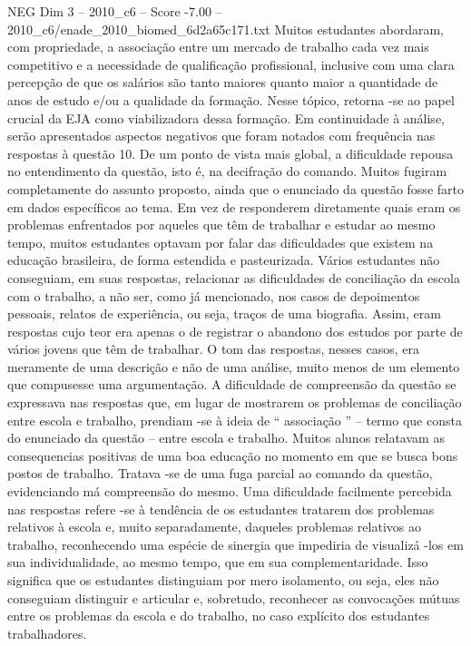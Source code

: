 \begin{textsample}{NEG Dim 3 – 2010\_c6 – Score -7.00 – 2010\_c6/enade\_2010\_biomed\_6d2a65c171.txt}
Muitos estudantes abordaram, com propriedade, a associação entre um mercado de trabalho cada vez mais competitivo e a necessidade de qualificação profissional, inclusive com uma clara percepção de que os salários são tanto maiores quanto maior a quantidade de anos de estudo e/ou a qualidade da formação.
Nesse tópico, retorna -se ao papel crucial da EJA como viabilizadora dessa formação.
Em continuidade à análise, serão apresentados aspectos negativos que foram notados com frequência nas respostas à questão 10.
De um ponto de vista mais global, a dificuldade repousa no entendimento da questão, isto é, na decifração do comando.
Muitos fugiram completamente do assunto proposto, ainda que o enunciado da questão fosse farto em dados específicos ao tema.
Em vez de responderem diretamente quais eram os problemas enfrentados por aqueles que têm de trabalhar e estudar ao mesmo tempo, muitos estudantes optavam por falar das dificuldades que existem na educação brasileira, de forma estendida e pasteurizada.
Vários estudantes não conseguiam, em suas respostas, relacionar as dificuldades de conciliação da escola com o trabalho, a não ser, como já mencionado, nos casos de depoimentos pessoais, relatos de experiência, ou seja, traços de uma biografia.
Assim, eram respostas cujo teor era apenas o de registrar o abandono dos estudos por parte de vários jovens que têm de trabalhar.
O tom das respostas, nesses casos, era meramente de uma descrição e não de uma análise, muito menos de um elemento que compusesse uma argumentação.
A dificuldade de compreensão da questão se expressava nas respostas que, em lugar de mostrarem os problemas de conciliação entre escola e trabalho, prendiam -se à ideia de “ associação ” – termo que consta do enunciado da questão – entre escola e trabalho.
Muitos alunos relatavam as consequencias positivas de uma boa educação no momento em que se busca bons postos de trabalho.
Tratava -se de uma fuga parcial ao comando da questão, evidenciando má compreensão do mesmo.
Uma dificuldade facilmente percebida nas respostas refere -se à tendência de os estudantes tratarem dos problemas relativos à escola e, muito separadamente, daqueles problemas relativos ao trabalho, reconhecendo uma espécie de sinergia que impediria de visualizá -los em sua individualidade, ao mesmo tempo, que em sua complementaridade.
Isso significa que os estudantes distinguiam por mero isolamento, ou seja, eles não conseguiam distinguir e articular e, sobretudo, reconhecer as convocações mútuas entre os problemas da escola e do trabalho, no caso explícito dos estudantes trabalhadores.

\end{textsample}
